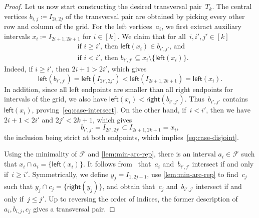 \documentclass[a4paper,UKenglish,cleveref,thm-restate]{lipics-v2021}
\theoremstyle{remark}
\newcommand{\eqdef}{\coloneqq}
\newcommand{\Lend}{\mathsf{left}}
\newcommand{\Rend}{\mathsf{right}}
\begin{document}
\begin{proof}
    Let us now start constructing the desired transversal pair~$T_k$.
    The central vertices $b_{i,j} \eqdef I_{2i,2j}$ of the transversal pair are obtained by picking every other row and column of the grid.
    For the left vertices~$a_i$, we first extract auxiliary intervals $x_i \eqdef I_{2i+1,2k+1}$ for $i \in [k]$.
    We claim that for all~$i,i',j' \in [k]$
    \begin{align}
        & \text{if $i \ge i'$, then $\Lend(x_i) \in b_{i',j'}$, and} \label{eq:case-intersect} \\
        & \text{if $i < i'$, then $b_{i',j'} \subseteq x_i \setminus \{\Lend(x_i)\}$.} \label{eq:case-disjoint}
    \end{align}
    Indeed, if $i \ge i'$, then $2i+1 > 2i'$, which gives
    \begin{equation}
        \Lend(b_{i',j'}) = \Lend(I_{2i',2j'}) < \Lend(I_{2i+1,2k+1}) = \Lend(x_i).
    \end{equation}
    In addition, since all left endpoints are smaller than all right endpoints for intervals of the grid, we also have $\Lend(x_i) < \Rend(b_{i',j'})$. Thus~$b_{i',j'}$ contains~$\Lend(x_i)$, proving~\eqref{eq:case-intersect}.
    On the other hand, if~$i < i'$, then we have $2i+1 < 2i'$ and $2j' < 2k+1$, which gives 
    \begin{equation}
        b_{i',j'} = I_{2i',2j'} \subset I_{2i+1,2k+1} = x_i,
    \end{equation}
    the inclusion being strict at both endpoints, which implies~\eqref{eq:case-disjoint}.
    
    Using the minimality of $\mathcal{F}$ and \cref{lem:min-arc-rep}, there is an interval $a_i \in \mathcal{F}$ such that $x_i \cap a_i = \{\Lend(x_i)\}$.
    It follows from~ that~$a_i$ and~$b_{i',j'}$ intersect if and only if~$i \ge i'$.
    Symmetrically, we define $y_j = I_{1,2j-1}$, use \cref{lem:min-arc-rep} to find~$c_j$ such that $y_j \cap c_j = \{\Rend(y_j)\}$, and obtain that~$c_j$ and~$b_{i',j'}$ intersect if and only if~$j \le j'$.
    Up to reversing the order of indices, the former description of $a_i,b_{i,j},c_j$ gives a transversal pair. %
\end{proof}
\end{document}
